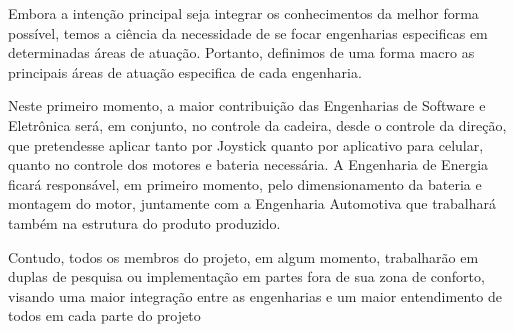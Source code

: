 Embora a intenção principal seja integrar os conhecimentos da melhor forma possível, temos a ciência da necessidade de se focar engenharias especificas em determinadas áreas de atuação. Portanto, definimos de uma forma macro as principais áreas de atuação especifica de cada engenharia.

Neste primeiro momento, a maior contribuição das Engenharias de Software e Eletrônica será, em conjunto, no controle da cadeira, desde o controle da direção, que pretendesse aplicar tanto por Joystick quanto por aplicativo para celular, quanto no controle dos motores e bateria necessária. A Engenharia de Energia ficará responsável, em primeiro momento, pelo dimensionamento da bateria e montagem do motor, juntamente com a Engenharia Automotiva que trabalhará também na estrutura do produto produzido.

Contudo, todos os membros do projeto, em algum momento, trabalharão em duplas de pesquisa ou implementação em partes fora de sua zona de conforto, visando uma maior integração entre as engenharias e um maior entendimento de todos em cada parte do projeto
